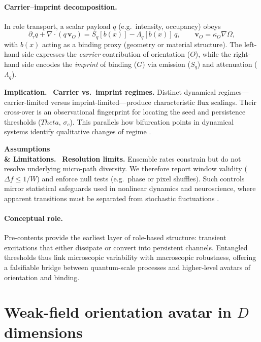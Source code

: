 \documentclass[12pt,a4paper,oneside]{scrreprt}
\def\Theta{Theta}%
\newenvironment{implication}{\par\vspace{0.5em}\noindent\textbf{Implication.}\ }{\par\vspace{0.5em}}
\newenvironment{limitation}{\par\vspace{0.5em}\noindent\textbf{Assumptions \\ \& Limitations.}\ }{\par\vspace{0.5em}}
\begin{document}
\paragraph{Carrier–imprint decomposition.} 
In role transport, a scalar payload $q$ (e.g.\ intensity, occupancy) obeys
\begin{equation}
\partial_{\tau} q + \nabla \!\cdot (q \, \mathbf v_O) 
= S_q[b(x)] - \Lambda_q[b(x)] \, q,
\qquad 
\mathbf v_O = \kappa_O \nabla \Omega, 
\label{eq:rt-role}
\end{equation}
with $b(x)$ acting as a binding proxy (geometry or material structure). 
The left-hand side expresses the \emph{carrier} contribution of orientation ($O$), 
while the right-hand side encodes the \emph{imprint} of binding ($G$) via 
emission ($S_q$) and attenuation ($\Lambda_q$). 

\begin{implication}
\textbf{Carrier vs.\ imprint regimes.} 
Distinct dynamical regimes—carrier-limited versus imprint-limited—produce 
characteristic flux scalings. 
Their cross-over is an observational fingerprint for locating the seed and 
persistence thresholds ($\Theta$, $\sigma_c$). 
This parallels how bifurcation points in dynamical systems identify qualitative 
changes of regime \citep{Strogatz2015Nonlinear}.
\end{implication}

\begin{limitation}
\textbf{Resolution limits.} 
Ensemble rates constrain but do not resolve underlying micro-path diversity. 
We therefore report window validity ($\Delta f \leq 1/W$) and enforce null tests 
(e.g.\ phase or pixel shuffles). 
Such controls mirror statistical safeguards used in nonlinear dynamics and 
neuroscience, where apparent transitions must be separated from stochastic 
fluctuations \citep{Theiler1992Testing}.
\end{limitation}

\paragraph{Conceptual role.} 
Pre-contents provide the earliest layer of role-based structure: transient 
excitations that either dissipate or convert into persistent channels. 
Entangled thresholds thus link microscopic variability with macroscopic 
robustness, offering a falsifiable bridge between quantum-scale processes 
and higher-level avatars of orientation and binding.


\section{Weak-field orientation avatar in $D$ dimensions}\label{sec:quanta-avatar-D}
\end{document}
